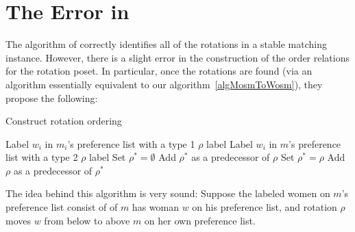\documentclass[12pt]{article}
\begin{document}



{}


\appendix

\section{The Error in \cite{GusfieldStableStructureAlgs89}}

The algorithm of \cite{GusfieldStableStructureAlgs89} correctly identifies all
of the rotations in a stable matching instance. However, there is a slight error
in the construction of the order relations for the rotation poset.
In particular, once the rotations are found (via an algorithm essentially
equivalent to our algorithm~\ref{algMosmToWosm}), they propose the following:
\begin{algorithm}
  \caption{Construct rotation ordering}\label{algRotationOrderGI}
\begin{algorithmic}[1]
    \State Label $w_i$ in $m_i$'s preference list with a type 1 $\rho$ label
      \State Label $w_i$ in $m$'s preference list with a type 2 $\rho$ label
    \EndFor
  \EndFor
    \State Set $\rho^* = \emptyset$
        \If { $\rho^* \ne \emptyset$ } 
          Add $\rho^*$ as a predecessor of $\rho$
        \EndIf
        \State Set $\rho^* = \rho$
      \EndIf
        \If {$\rho^*\ne \emptyset$}
          Add $\rho$ as a predecessor of $\rho^*$
        \EndIf
      \EndIf
    \EndFor
  \EndFor
\end{algorithmic}
\end{algorithm}

The idea behind this algorithm is very sound:
Suppose the labeled women on $m$'s preference list consist of
of $m$ has woman $w$ on his preference list,
and rotation $\rho$ moves $w$ from below to above $m$
on her own preference list.
\end{document}
